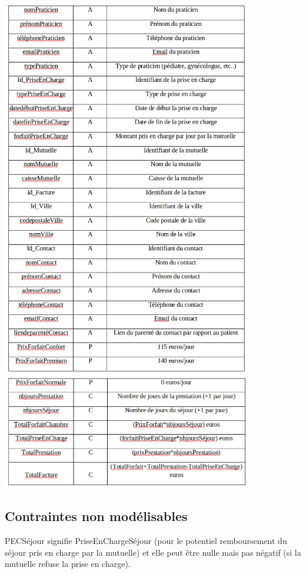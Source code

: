 \documentclass[12pt]{article}
\begin{document}
{\begin{adjustwidth}{20pt}{20pt}
    \includegraphics[width=0.82\textwidth]{DD2.png}\\[4cm]
    \includegraphics[width=0.82\textwidth]{DD3.png}\\[4cm]
    \newpage
    \subsection{Contraintes non modélisables}
    PECSéjour signifie PriseEnChargeSéjour (pour le potentiel remboursement du séjour pris en charge par la mutuelle) et elle peut être nulle mais pas négatif (si la mutuelle refuse la prise en charge).\bigskip


\end{adjustwidth}}
\end{document}
